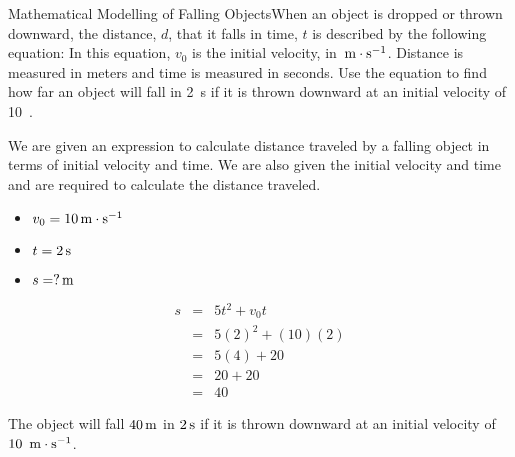\begin{wex}{Mathematical Modelling of Falling Objects}{When an object is dropped or thrown downward, the distance, $d$, that it falls in time, $t$ is described by the following equation:
In this equation, $v_0$ is the initial velocity, in $\,\mathrm{m \cdot s^{-1}}$. Distance is measured in meters and time is measured in seconds. Use the equation to find how far an object will fall in 2~s if it is thrown downward at an initial velocity of 10~\ms.}
{
We are given an expression to calculate distance traveled by a falling object in terms of initial velocity and time. We are also given the initial velocity and time and are required to calculate the distance traveled.

\begin{itemize}
\item $v_0 = 10\,\mathrm{m \cdot s^{-1}}$
\item $t = 2\,\mathrm{s}$
\item $s = ?\,\rm{m}$
\end{itemize}

\begin{eqnarray*}
s &=& 5t^2 + v_0t\\
&=&5(2)^2+(10)(2)\\
&=&5(4)+20\\
&=&20+20\\
&=&40
\end{eqnarray*}

The object will fall $40\,\rm{m}$ in $2\,\mathrm{s}$ if it is thrown downward at an initial velocity of $10~\,\mathrm{m \cdot s^{-1}}$.}
\end{wex}

